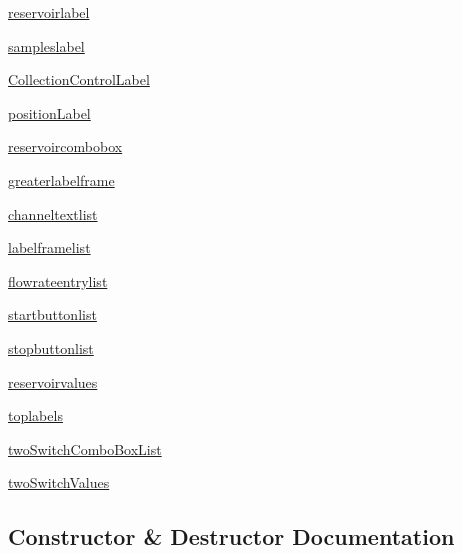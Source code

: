 \begin{DoxyCompactItemize}
\item 
\mbox{\hyperlink{class_g_u_i_1_1_manual_page_a8fe3878399005760149aef7d8fa9aff3}{reservoirlabel}}
\item 
\mbox{\hyperlink{class_g_u_i_1_1_manual_page_a4261b536bf3e9823187a8876200469ea}{sampleslabel}}
\item 
\mbox{\hyperlink{class_g_u_i_1_1_manual_page_ab7557543506cb709fbbbfa355b7a70d8}{Collection\+Control\+Label}}
\item 
\mbox{\hyperlink{class_g_u_i_1_1_manual_page_a412d981e04e70e81513f9a630fa22e61}{position\+Label}}
\item 
\mbox{\hyperlink{class_g_u_i_1_1_manual_page_af526de506280fcdbbc8e8c51f6f20be7}{reservoircombobox}}
\item 
\mbox{\hyperlink{class_g_u_i_1_1_manual_page_a36c96821e5fbedb62fa4a8a995d6a93c}{greaterlabelframe}}
\item 
\mbox{\hyperlink{class_g_u_i_1_1_manual_page_ac9d612abd4c9e4d3092e409037e09e80}{channeltextlist}}
\item 
\mbox{\hyperlink{class_g_u_i_1_1_manual_page_a8f91a0a819bcadfdcc1468b668ebc42a}{labelframelist}}
\item 
\mbox{\hyperlink{class_g_u_i_1_1_manual_page_af99dfa99bc1f8b8ac6e5a6b6f5944c71}{flowrateentrylist}}
\item 
\mbox{\hyperlink{class_g_u_i_1_1_manual_page_a16fa24c8f70b2c149b72c3875b8a0970}{startbuttonlist}}
\item 
\mbox{\hyperlink{class_g_u_i_1_1_manual_page_a5bd37d36a07ba48306378791eecf95d4}{stopbuttonlist}}
\item 
\mbox{\hyperlink{class_g_u_i_1_1_manual_page_aa01e7fba33e494110f2813bf072d9d04}{reservoirvalues}}
\item 
\mbox{\hyperlink{class_g_u_i_1_1_manual_page_af6724f6b2794b54ae00224013f7d63a5}{toplabels}}
\item 
\mbox{\hyperlink{class_g_u_i_1_1_manual_page_a26ec232a2655d365c6984d9337ba5e67}{two\+Switch\+Combo\+Box\+List}}
\item 
\mbox{\hyperlink{class_g_u_i_1_1_manual_page_a72ed3ad40742bf9e1d3c3c549b76f7c4}{two\+Switch\+Values}}
\end{DoxyCompactItemize}


\subsection{Constructor \& Destructor Documentation}
\mbox{\label{class_g_u_i_1_1_manual_page_a2734204da1ed4dacc54d8b6d2b8a71e3}} 
